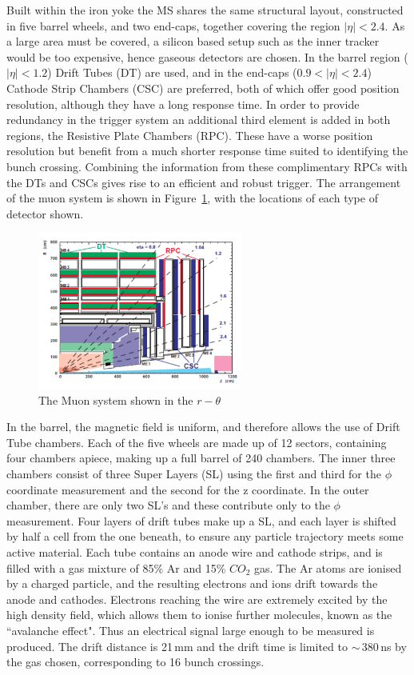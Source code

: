 Built within the iron yoke the MS shares the same structural layout, constructed in five barrel wheels, and two end-caps, together covering the region $|\eta| < 2.4$. As a large area must be covered, a silicon based setup such as the inner tracker would be too expensive, hence gaseous detectors are chosen. In the barrel region ($|\eta| < 1.2$) Drift Tubes (DT) are used, and in the end-caps ($0.9 < |\eta| < 2.4$) Cathode Strip Chambers (CSC) are preferred, both of which offer good position resolution, although they have a long response time. In order to provide redundancy in the trigger system an additional third element is added in both regions, the Resistive Plate Chambers (RPC). These have a worse position resolution but benefit from a much shorter response time suited to identifying the bunch crossing. Combining the information from these complimentary RPCs with the DTs and CSCs gives rise to an efficient and robust trigger. The arrangement of the muon system is shown in Figure~\ref{fig:MuonSystem}, with the locations of each type of detector shown.

\begin{figure}
\centering
\includegraphics[width=0.6\textwidth]{Figures/Detector/MS}
\caption{The Muon system shown in the $r-\theta$}
\label{fig:MuonSystem}
\end{figure}

In the barrel, the magnetic field is uniform, and therefore allows the use of Drift Tube chambers.  Each of the five wheels are made up of 12 sectors, containing four chambers apiece, making up a full barrel of 240 chambers. The inner three chambers consist of three Super Layers (SL) using the first and third for the $\phi$ coordinate measurement and the second for the z coordinate. In the outer chamber,  there are only two SL's and these contribute only to the $\phi$ measurement. Four layers of drift tubes make up a SL, and each layer is shifted by half a cell from the one beneath, to ensure any particle trajectory meets some active material. Each tube contains an anode wire and cathode strips, and is filled with a gas mixture of 85\% Ar and 15\% $CO_{2}$ gas. The Ar atoms are ionised by a charged particle, and the resulting electrons and ions drift towards the anode and cathodes. Electrons reaching the wire are extremely excited by the high density field, which allows them to ionise further molecules, known as the ``avalanche effect". Thus an electrical signal large enough to be measured is produced. The drift distance is 21\,mm and the drift time is limited to $\sim$\,380\,ns by the gas chosen, corresponding to 16 bunch crossings.

